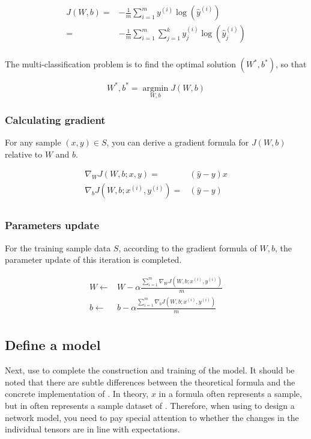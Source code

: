 \begin{content}
\begin{content}
\[\begin{aligned}
  J(W,b) =  &  - \frac{1}{m}\sum\limits_{i = 1}^m {{y^{(i)}}\log \left( {{{\widehat y}^{(i)}}} \right)}  \\ 
   =  &  - \frac{1}{m}\sum\limits_{i = 1}^m {\sum\limits_{j = 1}^k {y_j^{(i)}\log \left( {\widehat y_j^{(i)}} \right)} }  \\
\end{aligned} \]

The  multi-classification problem is to find the optimal solution $(W^*,b^*)$, so that

\[W^*,b^* = \mathop {\arg \min }\limits_{W,b} J(W,b)\]


\subsubsection{Calculating gradient}
For any sample $(x,y) \in S $, you can derive a gradient formula for $ J(W,b) $ relative to $ W $ and $ b $.

\[\begin{aligned}
  {\nabla _W}J\left( {W,b;x,y} \right) =  & \left( {\widehat y - y} \right)x \\ 
  {\nabla _b}J\left( {W,b;{x^{(i)}},{y^{(i)}}} \right) =  & \left( {\widehat y - y} \right) \\ 
\end{aligned} \]


\subsubsection{Parameters update}
For the training sample data $S$, according to the gradient formula of $W, b$, the parameter update of this iteration is completed.

\[\begin{aligned}
  W \leftarrow  & W - \alpha \frac{{\sum\limits_{i = 1}^m {{\nabla _W}J\left( {W,b;{x^{(i)}},{y^{(i)}}} \right)} }}{m} \\ 
  b \leftarrow  & b - \alpha \frac{{\sum\limits_{i = 1}^m {{\nabla _b}J\left( {W,b;{x^{(i)}},{y^{(i)}}} \right)} }}{m} \\ 
\end{aligned} \]


\subsection{Define a model}
Next, use \tf{} to complete the construction and training of the model. It should be noted that there are subtle differences between the theoretical formula and the concrete implementation of \tf{}. In theory, $x$ in a formula often represents a sample, but  in \tf{} often represents a sample dataset of . Therefore, when using \tf{} to design a network model, you need to pay special attention to whether the changes in the individual tensors are in line with expectations.



\end{content}
\end{content}
